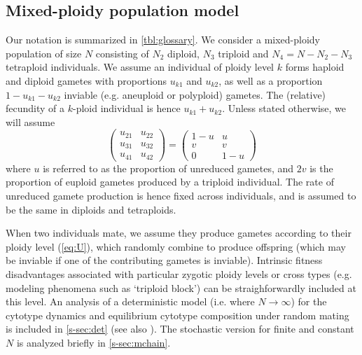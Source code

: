 \documentclass[12pt,a4paper]{article}
\begin{document}
    \subsection*{Mixed-ploidy population model}

    Our notation is summarized in \cref{tbl:glossary}.
    We consider a mixed-ploidy population of size $N$ consisting of $N_2$ diploid,
    $N_3$ triploid and $N_4=N-N_2-N_3$ tetraploid individuals.
    We assume an individual of ploidy level $k$ forms haploid and diploid gametes
    with proportions $u_{k1}$ and $u_{k2}$, as well as a proportion
    $1-u_{k1}-u_{k2}$ inviable (e.g. aneuploid or polyploid) gametes.
    The (relative) fecundity of a $k$-ploid individual is hence $u_{k1} + u_{k2}$.
    Unless stated otherwise, we will assume 
    \begin{equation}
        \begin{pmatrix} 
        u_{21} & u_{22} \\ 
        u_{31} & u_{32} \\ 
        u_{41} & u_{42} 
        \end{pmatrix} =
        \begin{pmatrix} 
        1-u & u \\
        v & v \\
        0 & 1-u
        \end{pmatrix} \label{eq:U}
    \end{equation}
    where $u$ is referred to as the proportion of unreduced gametes, and $2v$ is
    the proportion of euploid gametes produced by a triploid individual.
    The rate of unreduced gamete production is hence fixed across individuals, and
    is assumed to be the same in diploids and tetraploids.

    When two individuals mate, we assume they produce gametes according to their
    ploidy level (\cref{eq:U}), which randomly combine to produce offspring (which
    may be inviable if one of the contributing gametes is inviable).
    Intrinsic fitness disadvantages associated with particular zygotic ploidy
    levels or cross types (e.g. modeling phenomena such as `triploid block') can be
    straighforwardly included at this level.
    An analysis of a deterministic model (i.e. where $N \rightarrow \infty$) for
    the cytotype dynamics and equilibrium cytotype composition under random mating
    is included in \cref{s-sec:det} (see also \cite{felber1997,kauai2024}).
    The stochastic version for finite and constant $N$ is analyzed briefly in
    \cref{s-sec:mchain}.
\end{document}
